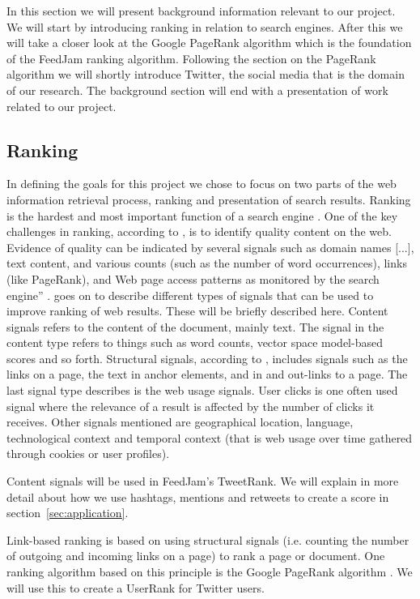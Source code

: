 In this section we will present background information relevant to our project. We will start by introducing ranking in relation to search engines. After this we will take a closer look at the Google PageRank algorithm which is the foundation of the FeedJam ranking algorithm.  Following the section on the PageRank algorithm we will shortly introduce Twitter, the social media that is the domain of our research. The background section will end with a presentation of work related to our project.

\subsection{Ranking} 
In defining the goals for this project we chose to focus on two parts of the web information retrieval process, ranking and presentation of search results. Ranking is the hardest and most important function of a search engine \cite[p.469]{Baeza-Yates2011}. One of the key challenges in ranking, according to \citet{Baeza-Yates2011}, is to identify quality content on the web. Evidence of quality can be indicated by several signals such as domain names [...], text content, and various counts (such as the number of word occurrences), links (like PageRank), and Web page access patterns as monitored by the search engine” \citep[p.468]{Baeza-Yates2011}. \citet{Baeza-Yates2011} goes on to describe different types of signals that can be used to improve ranking of web results. These will be briefly described here. Content signals refers to the content of the document, mainly text. The signal in the content type refers to things such as word counts, vector space model-based scores and so forth. Structural signals, according to \citet{Baeza-Yates2011}, includes signals such as the links on a page, the text in anchor elements, and in and out-links to a page.  The last signal type describes is the web usage signals. User clicks is one often used signal where the relevance of a result is affected by the number of clicks it receives. Other signals mentioned are geographical location, language, technological context and temporal context (that is web usage over time gathered through cookies or user profiles)\citep{Baeza-Yates2011}.

Content signals will be used in FeedJam's TweetRank. We will explain in more detail about how we use hashtags, mentions and retweets to create a score in section~\ref{sec:application}.

Link-based ranking is based on using structural signals (i.e. counting the number of outgoing and incoming links on a page) to rank a page or document. One ranking algorithm based on this  principle is the Google PageRank algorithm \citep{Page1999}. We will use this to create a UserRank for Twitter users. 

